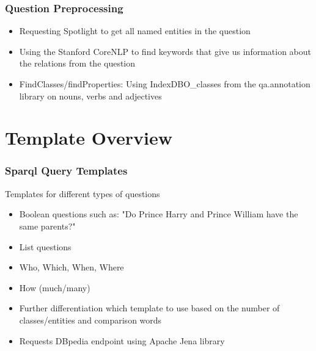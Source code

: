 \documentclass{beamer}
\begin{document}
\begin{frame}
\frametitle{Question Preprocessing}
\begin{itemize}
	\item Requesting Spotlight to get all named entities in the question
	\item Using the Stanford CoreNLP to find keywords that give us information about the relations from the question 
	\item FindClasses/findProperties: Using IndexDBO\_classes from the qa.annotation library on nouns, verbs and adjectives
\end{itemize}
\end{frame}

\section{Template Overview}

\begin{frame}
\frametitle{Sparql Query Templates}
\begin{block}{Templates for different types of questions}
	\begin{itemize}
		\item Boolean questions such as: "Do Prince Harry and Prince William have the same parents?"
		\item List questions
		\item Who, Which, When, Where 
		\item How (much/many)
	\end{itemize}
\end{block}
\begin{itemize}
	\item Further differentiation which template to use based on the number of classes/entities and comparison words
	\item Requests DBpedia endpoint using Apache Jena library 
\end{itemize}
\end{frame}
\end{document}

